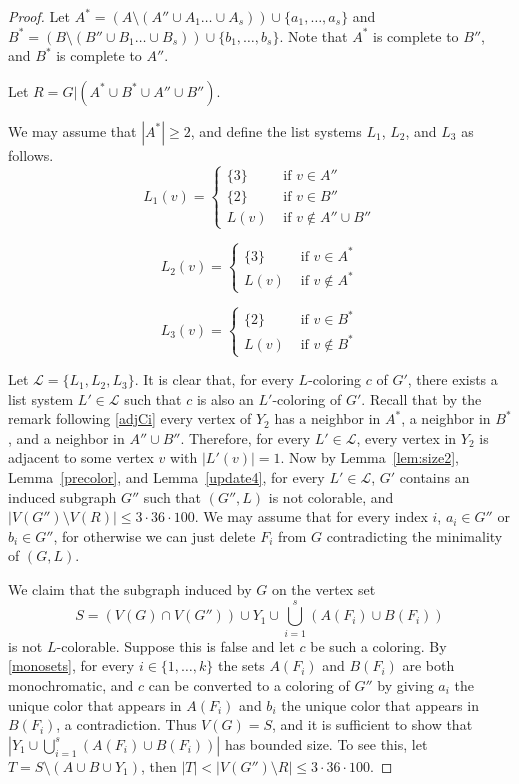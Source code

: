 \documentclass[11pt]{article}
\begin{document}
\begin{proof}
Let $A^*=(A \setminus (A'' \cup A_1 \ldots \cup A_s)) \cup \{a_1, \ldots, a_s\}$ and $B^*=(B \setminus (B'' \cup B_1 \ldots \cup B_s)) \cup \{b_1, \ldots, b_s\}$.
Note that $A^*$ is complete to $B''$, and $B^*$ is complete to 
$A''$.

Let $R=G|(A^* \cup B^* \cup A'' \cup B'' )$.  

We may assume that $|A^*|\geq 2$, and define the list systems $L_1$, $L_2$, and $L_3$ as follows.
$$L_1(v)= \begin{cases} \{3\} &\text{ if }v \in A'' \\
\{2\} &\text{ if }v \in B''\\
L(v) &\text{ if }v \not\in A'' \cup B'' \end{cases}$$

$$L_2(v)= \begin{cases} \{3\} &\text{ if }v \in A^* \\
L(v) &\text{ if }v \not\in A^* \end{cases}$$

$$L_3(v)= \begin{cases} \{2\} &\text{ if }v \in B^* \\
L(v) &\text{ if }v \not\in B^* \end{cases}$$

Let $\mathcal{L}=\{L_1,L_2,L_3\}$.
It is clear that, for every $L$-coloring $c$ of $G'$, there exists a list system $L' \in \mathcal{L}$ such that $c$ is also an $L'$-coloring of $G'$.
Recall that by the remark following \eqref{adjCi} every vertex of $Y_2$ has a  neighbor in  $A^*$, a neighbor in $B^*$, and a neighbor in $A'' \cup B''$. Therefore, for every $L' \in \mathcal{L}$, every vertex in $Y_2$ is adjacent to some vertex $v$ with  $|L'(v)|=1$.
Now by Lemma~\ref{lem:size2}, Lemma~\ref{precolor}, and Lemma~\ref{update4}, 
for every $L' \in \mathcal{L}$, 
$G'$ contains an induced subgraph $G''$ such that $(G'',L)$ is not 
colorable, and $|V(G'') \setminus V(R)|\leq 3\cdot 36\cdot 100$.
We may assume that for every index $i$, $a_i\in G''$ or $b_i\in G''$, for otherwise we can just delete $F_i $ from $G$ contradicting the minimality of $(G,L)$. 

We claim that the subgraph induced by $G$ on the vertex set $$S=(V(G) \cap V(G'')) \cup Y_1 \cup \bigcup_{i=1}^s (A(F_i) \cup B(F_i))$$
 is not $L$-colorable. 
Suppose this is false and let $c$ be such a coloring.  
By \eqref{monosets}, for every $i \in \{1, \ldots, k\}$ the sets $A(F_i)$ and $B(F_i)$ are both monochromatic, and $c$ can be converted to a coloring of $G''$ by giving $a_i$ the unique color that appears in $A(F_i)$ and $b_i$ the unique color that appears in $B(F_i)$, a contradiction.  
Thus $V(G)=S$, and it is sufficient to show that $|Y_1 \cup \bigcup_{i=1}^s (A(F_i) \cup B(F_i))|$ has bounded size.
 To see this, let $T=S\setminus (A \cup B \cup Y_1)$, then 
$|T|< |V(G'') \setminus R| \leq   3\cdot 36\cdot 100$.




\end{proof}
\end{document}
